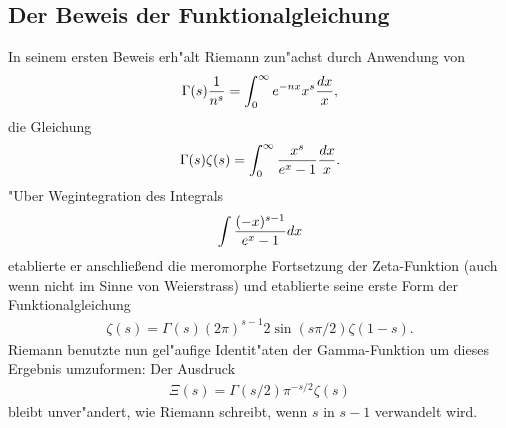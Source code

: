 \subsection{Der Beweis der Funktionalgleichung}
	In seinem ersten Beweis erh"alt Riemann zun"achst durch Anwendung von
	\begin{align}\label{eq:riemannstart}
		\Gamma(s)\frac{1}{n^s} = \int_0^\infty e^{-nx}x^{s}\frac{d{x}}{x},
	\end{align}
	die Gleichung
	\begin{align*}
		\Gamma(s)\zeta(s) = \int_0^\infty \frac{x^{s}}{e^x-1} \frac{d{x}}{x}.
	\end{align*}
	"Uber Wegintegration des Integrals
	\begin{align*}
		\int \frac{(-x)^{s-1}}{e^x-1}d{x}
	\end{align*}
	etablierte er anschließend die meromorphe Fortsetzung der Zeta-Funktion (auch wenn nicht im Sinne von Weierstrass) und etablierte seine erste Form der Funktionalgleichung
	\begin{align*}
		\zeta(s) = \Gamma(s)(2\pi)^{s-1} 2 \sin(s\pi/2) \zeta(1-s).
	\end{align*}
	Riemann benutzte nun gel"aufige Identit"aten der Gamma-Funktion um dieses Ergebnis umzuformen:
	Der Ausdruck
	\begin{align*}
		\Xi(s) = \Gamma(s/2)\pi^{-s/2}\zeta(s)
	\end{align*}
	bleibt unver"andert, wie Riemann schreibt, \glqq wenn $s$ in $s-1$ verwandelt wird.\grqq{}
	

